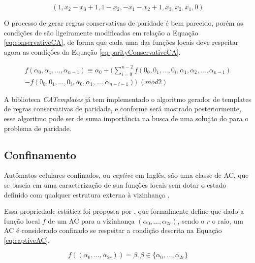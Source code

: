 \documentclass[12pt,a4paper]{article}
\begin{document}
	\begin{equation}
	(1,x_2-x_3+1,1-x_2,-x_1-x_2+1,x_3,x_2,x_1,0)
	\label{eq:conservativeTemplate}
	\end{equation}

	O processo de gerar regras conservativas de paridade é bem parecido, porém as condições de  são ligeiramente modificadas em relação a Equação \ref{eq:conservativeCA}, de forma que cada uma das funções locais deve respeitar agora as condições da Equação \ref{eq:parityConservativeCA}.

	\begin{equation}
	\begin{split}
	f(\alpha_0,\alpha_1, \dots,\alpha_{n-1}) \equiv \alpha_0 + (\sum_{i=0}^{n-2}f(0_0,0_1, \dots,0_i,\alpha_1,\alpha_2, \dots,\alpha_{n-1}) \\- f(0_0,0_1, \dots,0_i,\alpha_0,\alpha_1, \dots,\alpha_{n-i-1})) \; (mod 2)  
	\label{eq:parityConservativeCA}
	\end{split}
	\end{equation}

	A biblioteca \textit{CATemplates} já tem implementado o algoritmo gerador de templates de regras conservativas de paridade, e conforme será mostrado posteriormente, esse algoritmo pode ser de suma importância na busca de uma solução do para o problema de paridade.





	\subsection{Confinamento}
	Autômatos celulares confinados, ou \textit{captive} em Inglês, são uma classe de AC, que se baseia em uma caracterização de sua funções locais sem dotar o estado definido com qualquer estrutura externa à vizinhança \cite{theyssier2004captive}. 

	Essa propriedade estática foi proposta por , que formalmente define que dado a função local $f$ de um AC para a vizinhança $(\alpha_0, \dots, \alpha_{2r})$, sendo o $r$ o raio, um AC é considerado confinado se respeitar a condição descrita na Equação \ref{eq:captiveAC}.

	\begin{equation}
	f((\alpha_0, \dots, \alpha_{2r})) = \beta, \beta \in \{\alpha_0, \dots, \alpha_{2r}\}
	\label{eq:captiveAC}
	\end{equation}
\end{document}
